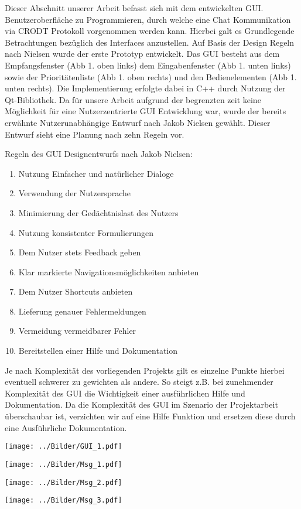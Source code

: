 Dieser Abschnitt unserer Arbeit befasst sich mit dem entwickelten
GUI. Benutzeroberfl{\"a}che zu Programmieren, durch welche eine Chat
Kommunikation via CRODT Protokoll vorgenommen werden kann. Hierbei galt es
Grundlegende Betrachtungen bez{\"u}glich des Interfaces anzustellen. Auf Basis
der Design Regeln nach Nielsen wurde der erste Prototyp entwickelt. Das GUI
besteht aus dem Empfangsfenster (Abb 1. oben links) dem Eingabenfenster (Abb 1.
unten links) sowie der Priorit{\"a}tenliste (Abb 1. oben rechts) und den
Bedienelementen (Abb 1. unten rechts). Die Implementierung erfolgte dabei in
C++ durch Nutzung der Qt-Bibliothek. Da f{\"u}r unsere Arbeit aufgrund der
begrenzten zeit keine M{\"o}glichkeit f{\"u}r eine Nutzerzentrierte GUI
Entwicklung war, wurde der bereits erw{\"a}hnte Nutzerunabh{\"a}ngige Entwurf
nach Jakob Nielsen gew{\"a}hlt. Dieser Entwurf sieht eine Planung nach zehn
Regeln vor.

Regeln des GUI Designentwurfs nach Jakob Nielsen:

   \begin{enumerate}[I]
     \item Nutzung Einfacher und nat{\"u}rlicher Dialoge
     \item Verwendung der Nutzersprache
     \item Minimierung der Ged{\"a}chtnislast des Nutzers
     \item Nutzung konsistenter Formulierungen
     \item Dem Nutzer stets Feedback geben
     \item Klar markierte Navigationsm{\"o}glichkeiten anbieten
     \item Dem Nutzer Shortcuts anbieten
     \item Lieferung genauer Fehlermeldungen
     \item Vermeidung vermeidbarer Fehler
     \item Bereitstellen einer Hilfe und Dokumentation
   \end{enumerate}

Je nach Komplexit{\"a}t des vorliegenden Projekts gilt es einzelne Punkte
hierbei eventuell schwerer zu gewichten als andere. So steigt z.B. bei
zunehmender Komplexit{\"a}t des GUI die Wichtigkeit einer ausf{\"u}hrlichen
Hilfe und Dokumentation. Da die Komplexit{\"a}t des GUI im Szenario der
Projektarbeit {\"u}berschaubar ist, verzichten wir auf eine Hilfe Funktion und
ersetzen diese durch eine Ausf{\"u}hrliche Dokumentation.

\begin{center}
\texttt{[image: ../Bilder/GUI\_1.pdf]}
\end{center}

\begin{center}
\texttt{[image: ../Bilder/Msg\_1.pdf]}
\end{center}

\begin{center}
\texttt{[image: ../Bilder/Msg\_2.pdf]}
\end{center}

\begin{center}
\texttt{[image: ../Bilder/Msg\_3.pdf]}
\end{center}

